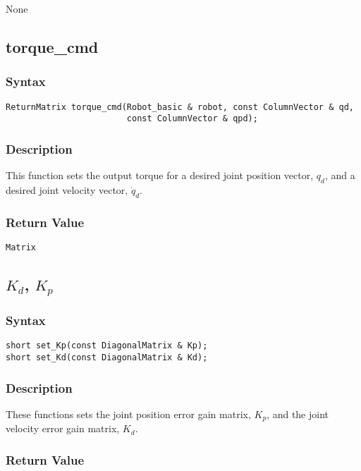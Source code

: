\documentclass[11pt,fleqn,letterpaper]{report}
\begin{document}
None

\newpage

\subsection*{torque\_cmd}
\subsubsection*{Syntax}
\begin{verbatim}
ReturnMatrix torque_cmd(Robot_basic & robot, const ColumnVector & qd,
                        const ColumnVector & qpd);
\end{verbatim}

\subsubsection*{Description}   
This function sets the output torque for a desired joint position
vector, $q_d$, and a desired joint velocity vector, $\dot{q}_d$.

\subsubsection*{Return Value}

\texttt{Matrix}

\newpage

\subsection*{$K_d$, $K_p$}
\subsubsection*{Syntax}
\begin{verbatim}
short set_Kp(const DiagonalMatrix & Kp);
short set_Kd(const DiagonalMatrix & Kd);

\end{verbatim}

\subsubsection*{Description}   
These functions sets the joint position error gain matrix, $K_p$, and
the joint velocity error gain matrix, $K_d$.
\subsubsection*{Return Value}
\end{document}
